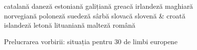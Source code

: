 \documentclass[]{../../metanetpaper}
\begin{document}
\begin{multicols}{2}
\begin{figure}[tb]
\begin{tabular}
catalană \newline 
daneză \newline 
estoniană \newline 
galițiană\newline 
greacă \newline 
irlandeză \newline 
maghiară \newline
norvegiană \newline 
poloneză \newline 
suedeză \newline
sârbă \newline 
slovacă \newline 
slovenă \newline 
& \vspace*{0.5mm} 
croată \newline 
islandeză\newline 
letonă \newline 
lituaniană \newline 
malteză \newline 
română\\
\end{tabular}
\caption{Prelucrarea vorbirii: situația pentru 30 de limbi europene}
\label{fig:speech_cluster_de}
\end{figure}


\end{multicols}
\end{document}
